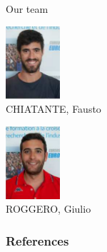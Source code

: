 \documentclass[aspectratio=169, handout]{beamer}
\begin{document}
\begin{frame}{Our team}
\begin{minipage}[l][\dimexpr 0.45\textheight-2\fboxsep-2\fboxrule\relax][t]{\dimexpr .495\textwidth-2\fboxsep-2\fboxrule\relax}
      \begin{center}
        \includegraphics[height=2.7cm]{./graphics/chiatante}\\
        CHIATANTE, Fausto
      \end{center}
  \end{minipage}%
  \hfill
  \begin{minipage}[r][\dimexpr 0.45\textheight-2\fboxsep-2\fboxrule\relax][t]{\dimexpr .495\textwidth-2\fboxsep-2\fboxrule\relax}%
    \begin{center}
      \includegraphics[height=2.7cm]{./graphics/roggero}\\
      ROGGERO, Giulio
    \end{center}
  \end{minipage}%
\end{frame}

\begin{frame}[allowframebreaks]
	\frametitle{References}
	\footnotesize
	
	
\end{frame}
\end{document}
